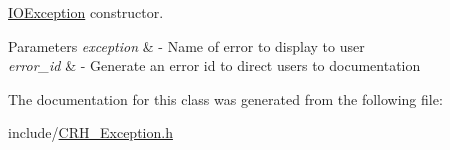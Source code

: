 \hyperlink{classcrunchy_1_1_i_oexception_1_1_i_o_exception}{I\+O\+Exception} constructor. 


\begin{DoxyParams}{Parameters}
{\em exception} & -\/ Name of error to display to user \\
\hline
{\em error\+\_\+id} & -\/ Generate an error id to direct users to documentation \\
\hline
\end{DoxyParams}


The documentation for this class was generated from the following file\+:\begin{DoxyCompactItemize}
\item 
include/\hyperlink{_c_r_h___exception_8h}{C\+R\+H\+\_\+\+Exception.\+h}\end{DoxyCompactItemize}
